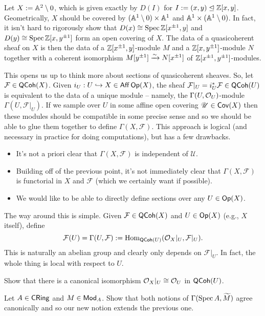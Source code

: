 \documentclass[11pt]{article}
\renewcommand{\F}{\mathcal{F}}
\newcommand{\U}{\mathscr{U}}
\begin{document}
\begin{example}
Let $X:=\mathbb{A}^2\setminus0$, which is given exactly by $D(I)$ for $I:=(x,y)\trianglelefteq\mathbb{Z}[x,y]$. Geometrically, $X$ should be covered by $(\mathbb{A}^1\setminus0)\times\mathbb{A}^1$ and $\mathbb{A}^1\times(\mathbb{A}^1\setminus0)$. In fact, it isn't hard to rigorously show that $D(x)\cong\operatorname{Spec}\mathbb{Z}[x^{\pm1},y]$ and $D(y)\cong\operatorname{Spec}\mathbb{Z}[x,y^{\pm1}]$ form an open covering of $X$. The data of a quasicoherent sheaf on $X$ is then the data of a $\mathbb{Z}[x^{\pm1},y]$-module $M$ and a $\mathbb{Z}[x,y^{\pm1}]$-module $N$ together with a coherent isomorphism $M[y^{\pm1}]\xrightarrow{\sim}N[x^{\pm1}]$ of $\mathbb{Z}[x^{\pm1},y^{\pm1}]$-modules.
\end{example}

This opens us up to think more about sections of quasicoherent sheaves. So, let $\F\in\QCoh(X)$. Given $i_U: U\hookrightarrow X\in\operatorname{\mathsf{Aff}}\operatorname{\mathsf{Op}}(X)$, the sheaf $\F|_U=i_U^*\F\in\QCoh(U)$ is equivalent to the data of a unique module -- namely, the $\Gamma(U,\mathcal{O}_U)$-module $\Gamma(U,\F|_U)$. If we sample over $U$ in some affine open covering $\U\in\Cov(X)$ then these modules should be compatible in some precise sense and so we should be able to glue them together to define $\Gamma(X,\F)$. This approach is logical (and necessary in practice for doing computations), but has a few drawbacks.
\begin{itemize}
\item It's not a priori clear that $\Gamma(X,\F)$ is independent of $\U$.

\item Building off of the previous point, it's not immediately clear that $\Gamma(X,\F)$ is functorial in $X$ and $\F$ (which we certainly want if possible).

\item We would like to be able to directly define sections over any $U\in\operatorname{\mathsf{Op}}(X)$.
\end{itemize}
The way around this is simple. Given $\F\in\QCoh(X)$ and $U\in\operatorname{\mathsf{Op}}(X)$ (e.g., $X$ itself), define
$$\F(U)=\Gamma(U,\F):=\Hom_{\QCoh(U)}(\O_X|_U,\F|_U).$$
This is naturally an abelian group and clearly only depends on $\F|_U$. In fact, the whole thing is local with respect to $U$.

\begin{exercise}
Show that there is a canonical isomorphism $\mathcal{O}_X|_U\cong\mathcal{O}_U$ in $\operatorname{\mathsf{QCoh}}(U)$.
\end{exercise}

\begin{exercise}
Let $A\in\operatorname{\mathsf{CRing}}$ and $M\in\operatorname{\mathsf{Mod}}_A$. Show that both notions of $\Gamma(\operatorname{Spec} A,\widetilde{M})$ agree canonically and so our new notion extends the previous one.
\end{exercise}
\end{document}
